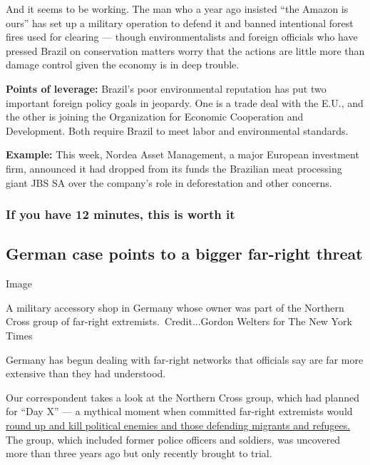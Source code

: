 And it seems to be working. The man who a year ago insisted ``the Amazon
is ours'' has set up a military operation to defend it and banned
intentional forest fires used for clearing --- though environmentalists
and foreign officials who have pressed Brazil on conservation matters
worry that the actions are little more than damage control given the
economy is in deep trouble.

\textbf{Points of leverage:} Brazil's poor environmental reputation has
put two important foreign policy goals in jeopardy. One is a trade deal
with the E.U., and the other is joining the Organization for Economic
Cooperation and Development. Both require Brazil to meet labor and
environmental standards.

\textbf{Example:} This week, Nordea Asset Management, a major European
investment firm, announced it had dropped from its funds the Brazilian
meat processing giant JBS SA over the company's role in deforestation
and other concerns.

\hypertarget{if-you-have-12-minutes-this-is-worth-it}{%
\subsubsection{If you have 12 minutes, this is worth
it}\label{if-you-have-12-minutes-this-is-worth-it}}

\hypertarget{german-case-points-to-a-bigger-far-right-threat}{%
\subsection{German case points to a bigger far-right
threat}\label{german-case-points-to-a-bigger-far-right-threat}}

Image

A military accessory shop in Germany whose owner was part of the
Northern Cross group of far-right extremists.~Credit...Gordon Welters
for The New York Times

Germany has begun dealing with far-right networks that officials say are
far more extensive than they had understood.

Our correspondent takes a look at the Northern Cross group, which had
planned for ``Day X'' --- a mythical moment when committed far-right
extremists would
\href{https://www.nytimes3xbfgragh.onion/2020/08/01/world/europe/germany-nazi-infiltration.html}{round
up and kill political enemies and those defending migrants and
refugees.} The group, which included former police officers and
soldiers, was uncovered more than three years ago but only recently
brought to trial.

